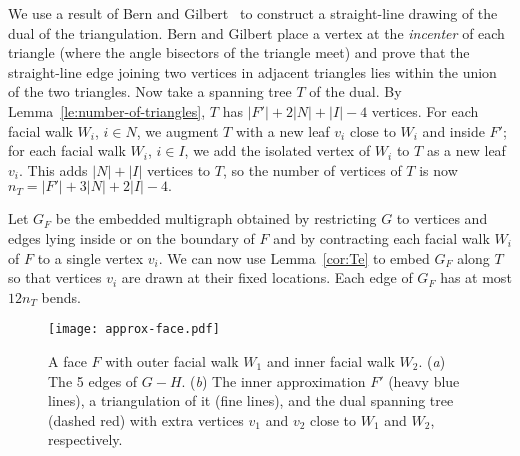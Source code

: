 \documentclass{llncs}
\begin{document}
We use a result of Bern and Gilbert~\cite{BG92} to construct a straight-line drawing of the dual of the triangulation.  Bern and Gilbert place a vertex at the {\em incenter} of each
triangle (where the angle bisectors of the triangle meet) and prove that the straight-line edge joining two vertices in adjacent triangles lies within the union of the two triangles. Now take a spanning tree $T$ of the dual. By Lemma~\ref{le:number-of-triangles}, $T$ has $|F'| + 2|N| + |I| -4$ vertices. For each facial walk $W_i$, $i \in N$, we augment $T$ with a new leaf  $v_i$ close to $W_i$ and inside $F'$; for each facial walk $W_i$, $i \in I$, we add the isolated vertex of $W_i$ to $T$ as a new leaf $v_i$. This adds $|N| + |I|$ vertices to $T$, so the number of vertices of $T$ is now $n_T = |F'| + 3|N| + 2|I| -4.$


Let $G_F$ be the embedded multigraph obtained by restricting $G$ to vertices and edges lying inside or on the boundary of $F$ and by contracting each facial walk $W_i$ of $F$ to a single vertex $v_i$. We can now use Lemma~\ref{cor:Te} to embed $G_F$ along $T$ so that vertices $v_i$ are drawn at their fixed locations. Each edge of $G_F$ has at most $12n_T$ bends.


\begin{figure}[tb]
\centering
\texttt{[image: approx-face.pdf]}
\caption{A face $F$ with outer facial walk $W_1$ and inner facial walk $W_2$.  (\emph{a}) The 5 edges of $G-H$.  (\emph{b}) The inner approximation $F'$ (heavy blue lines), a triangulation of it (fine lines), and the dual spanning tree (dashed red) with extra vertices $v_1$ and $v_2$ close to  $W_1$ and $W_2$, respectively.}

\label{fig:route1}
\end{figure}
\end{document}
